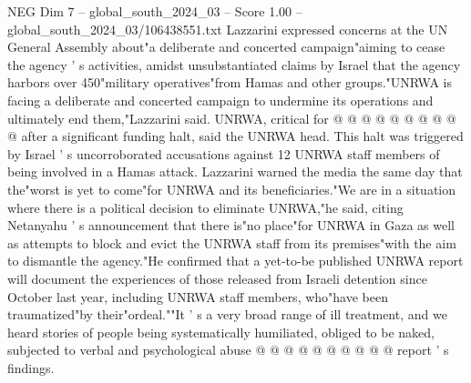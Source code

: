 \begin{textsample}{NEG Dim 7 – global\_south\_2024\_03 – Score 1.00 – global\_south\_2024\_03/106438551.txt}
Lazzarini expressed concerns at the UN General Assembly about"a deliberate and concerted campaign"aiming to cease the agency ' s activities, amidst unsubstantiated claims by Israel that the agency harbors over 450"military operatives"from Hamas and other groups."UNRWA is facing a deliberate and concerted campaign to undermine its operations and ultimately end them,"Lazzarini said.
UNRWA, critical for @ @ @ @ @ @ @ @ @ @ after a significant funding halt, said the UNRWA head.
This halt was triggered by Israel ' s uncorroborated accusations against 12 UNRWA staff members of being involved in a Hamas attack.
Lazzarini warned the media the same day that the"worst is yet to come"for UNRWA and its beneficiaries."We are in a situation where there is a political decision to eliminate UNRWA,"he said, citing Netanyahu ' s announcement that there is"no place"for UNRWA in Gaza as well as attempts to block and evict the UNRWA staff from its premises"with the aim to dismantle the agency."He confirmed that a yet-to-be published UNRWA report will document the experiences of those released from Israeli detention since October last year, including UNRWA staff members, who"have been traumatized"by their"ordeal.""It ' s a very broad range of ill treatment, and we heard stories of people being systematically humiliated, obliged to be naked, subjected to verbal and psychological abuse @ @ @ @ @ @ @ @ @ @ report ' s findings.

\end{textsample}
